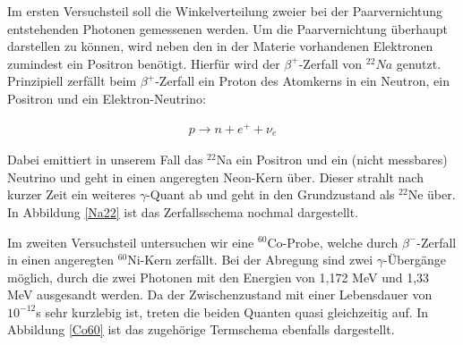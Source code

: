 \documentclass[11pt]{scrartcl}
\begin{document}
Im ersten Versuchsteil soll die Winkelverteilung zweier bei der Paarvernichtung entstehenden Photonen gemessenen werden. Um die Paarvernichtung überhaupt darstellen zu können, wird neben den in der Materie vorhandenen Elektronen zumindest ein Positron benötigt. Hierfür wird der $\beta^+$-Zerfall von $^{22}Na$ genutzt. Prinzipiell zerfällt beim $\beta^+$-Zerfall ein Proton des Atomkerns in ein Neutron, ein Positron und ein Elektron-Neutrino:

\begin{align}
p \rightarrow n + e^+ + \nu_e
\end{align}

Dabei emittiert in unserem Fall das $^{22}$Na  ein Positron und ein (nicht messbares) Neutrino und geht in einen angeregten Neon-Kern über. Dieser strahlt nach kurzer Zeit ein weiteres $\gamma$-Quant ab und geht in den Grundzustand als $^{22}$Ne über. In Abbildung \ref{Na22} ist das Zerfallsschema nochmal dargestellt.

Im zweiten Versuchsteil untersuchen wir eine $^{60}$Co-Probe, welche durch $\beta^-$-Zerfall in einen angeregten $^{60}$Ni-Kern zerfällt. Bei der Abregung sind zwei $\gamma$-Übergänge möglich, durch die zwei Photonen mit den Energien von 1,172 MeV und 1,33 MeV ausgesandt werden. Da der Zwischenzustand mit einer Lebensdauer  von $10^{-12}$s sehr kurzlebig ist, treten die beiden Quanten quasi gleichzeitig auf. In Abbildung \ref{Co60} ist das zugehörige Termschema ebenfalls dargestellt.
\end{document}
